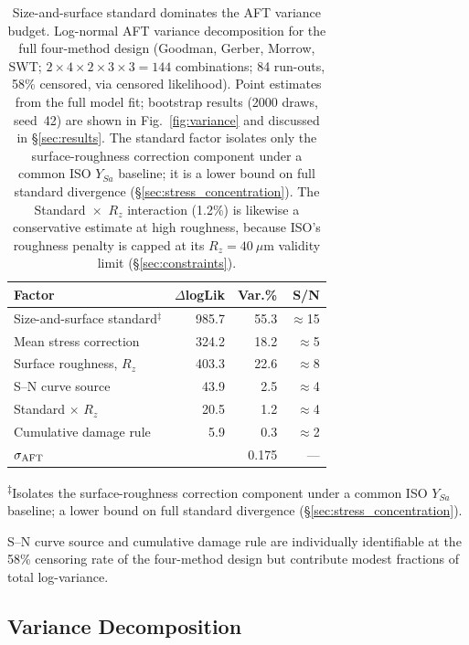 \documentclass[twocolumn,12pt,a4paper]{article}
\begin{document}
\begin{table}[h]
\centering
\caption{Size-and-surface standard dominates the AFT variance budget.
Log-normal AFT variance decomposition for the full four-method design
(Goodman, Gerber, Morrow, SWT;
$2\times4\times2\times3\times3 = 144$ combinations; 84 run-outs,
58\% censored, via censored likelihood). Point estimates from the
full model fit; bootstrap results (2000 draws, seed~42) are shown
in Fig.~\ref{fig:variance} and discussed in \S\ref{sec:results}.
The standard factor isolates only the surface-roughness correction
component under a common ISO $Y_{Sa}$ baseline; it is a lower bound
on full standard divergence (\S\ref{sec:stress_concentration}). The
Standard~$\times$~$R_z$ interaction (1.2\%) is likewise a conservative
estimate at high roughness, because ISO's roughness penalty is capped
at its $R_z=40~\mu$m validity limit
(\S\ref{sec:constraints}).}
\label{tab:anova}
\footnotesize
\begin{tabular}{lrrr}
\toprule
Factor & $\Delta$logLik & Var.\% & S/N \\
\midrule
Size-and-surface standard$^\ddagger$ & 985.7 & 55.3 & $\approx$15 \\
Mean stress correction & 324.2 & 18.2 & $\approx$5 \\
Surface roughness, $R_z$    & 403.3 & 22.6 & $\approx$8 \\
S--N curve source      & 43.9 &  2.5 &  $\approx$4 \\
Standard $\times$ $R_z$     & 20.5 &  1.2 &  $\approx$4 \\
Cumulative damage rule &  5.9 &  0.3 &  $\approx$2 \\
\midrule
$\sigma_{\rm AFT}$          &        & 0.175 & --- \\
\bottomrule
\end{tabular}

\medskip\noindent\textsuperscript{$\ddagger$}Isolates the surface-roughness
correction component under a common ISO $Y_{Sa}$ baseline; a lower bound on
full standard divergence (\S\ref{sec:stress_concentration}).

\noindent S--N curve source and cumulative damage rule are individually
identifiable at the 58\% censoring rate of the four-method design but
contribute modest fractions of total log-variance.
\end{table}

\subsection{Variance Decomposition}
\end{document}
